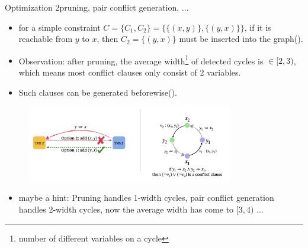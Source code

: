\begin{frame}{Optimization 2}{pruning, pair conflict generation, ...}
	\scriptsize{
		\begin{itemize}
			\item for a simple constraint $C = \{C_1, C_2\} = \{\{(x, y)\}, \{(y, x)\}\}$, if it is reachable from $y$ to $x$, then $C_2 = \{(y, x)\}$ must be inserted into the graph().
			\item Observation: after pruning, the average width\footnote{\tiny{number of different variables on a cycle}} of detected cycles is $\in [2, 3)$, which means most conflict clauses only consist of 2 variables.
			\item Such clauses can be generated beforewise().
		\end{itemize}
	}

	\begin{figure}[H]
		\centering
		\includegraphics[width=0.8\textwidth]{figs/pruning-and-pair-conflict-generation.png}
	\end{figure}

	\begin{itemize}
		\item maybe a hint: Pruning handles 1-width cycles, pair conflict generation handles 2-width cycles, now the average width has come to $[3, 4)$ ...
	\end{itemize}
\end{frame}

